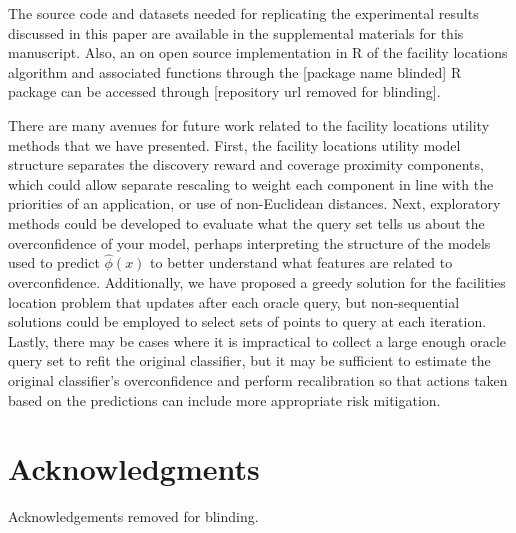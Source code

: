 \documentclass[conference]{IEEEtran}
\newcommand{\km}[1]{{\color{red} #1}} %
\begin{document}

The source code and datasets needed for replicating the experimental results discussed in this paper are available in the supplemental materials for this manuscript. Also, an on open source  implementation in R \citep{R} of the facility locations algorithm and associated functions through the [package name blinded] R package can be accessed through [repository url removed for blinding].

There are many avenues for future work related to the facility locations utility methods that we have presented. First, the facility locations utility model structure separates the discovery reward and coverage proximity components, which could allow separate rescaling to weight each component in line with the priorities of an application, or use of non-Euclidean distances. Next, exploratory methods could be developed to evaluate what the query set tells us about the overconfidence of your model, perhaps interpreting the structure of the models used to predict $\hat{\phi}(x)$ to better understand what features are related to overconfidence. Additionally, we have proposed a greedy solution for the facilities location problem that updates after each oracle query, but non-sequential solutions could be employed to select sets of points to query at each iteration. Lastly, there may be cases where it is impractical to collect a large enough oracle query set to refit the original classifier, but it may be sufficient to estimate the original classifier’s overconfidence and perform recalibration so that actions taken based on the predictions can include more appropriate risk mitigation. 

\section{Acknowledgments} 

Acknowledgements removed for blinding.







\end{document}
